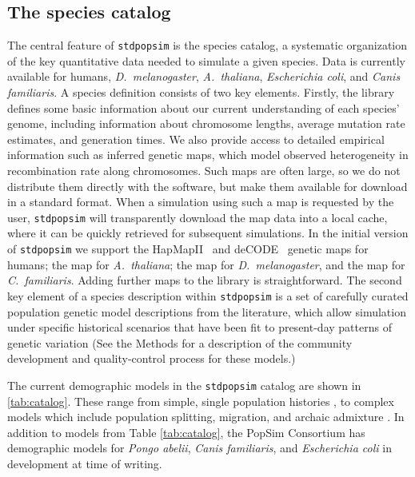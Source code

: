 \documentclass[12pt,halfline,a4paper]{ouparticle}
\newcommand{\stdpopsim}{\texttt{stdpopsim}\xspace}
\begin{document}
\subsection*{The species catalog}

The central feature of \stdpopsim is the species catalog, a systematic organization
of the key quantitative data needed to simulate a given species.
Data is currently available for humans,
\textit{D.~melanogaster}, \textit{A.~thaliana},
\textit{Escherichia coli}, and \textit{Canis familiaris}.
A species definition consists of two key elements.
Firstly, the library defines some basic information about our current understanding of each
species' genome, including information about chromosome
lengths, average mutation rate estimates, and generation times.
We also provide access to detailed empirical information such as inferred genetic maps,
which model observed heterogeneity in recombination rate along chromosomes.
Such maps are often large,
so we do not distribute them directly with the software, but make them available
for download in a standard format.
When a simulation using such a map is requested by the user,
\stdpopsim will transparently download the map data into a local cache,
where it can be quickly retrieved for subsequent simulations.
In the initial version of \stdpopsim we support
the HapMapII~\citep{international2007second} and
deCODE~\citep{kong2010fine} genetic maps for humans;
the \cite{salome2011recombination} map for \textit{A.~thaliana};
the \cite{comeron2012many} map for \textit{D.~melanogaster},
and the \cite{campbell2016pedigree} map for \textit{C.~familiaris}.
Adding further maps to the library is straightforward.
The second key element of a species description
within \stdpopsim is a set of carefully curated population genetic model
descriptions from the literature, which allow simulation under
specific historical scenarios that have been fit to present-day patterns of
genetic variation (See the Methods for a description of the community
development and quality-control process for these models.)

The current demographic models in the \stdpopsim catalog are shown in \autoref{tab:catalog}.
These range from
simple, single population histories \cite[e.g.,][]{sheehan2016deep},
to complex models which include population splitting, migration, and archaic
admixture \cite[e.g.,][]{ragsdale2019models}.
In addition to models from Table \autoref{tab:catalog},
the PopSim Consortium has demographic models for \textit{Pongo abelii}, \textit{Canis familiaris}, and \textit{Escherichia coli} in development at time of writing.
\end{document}
